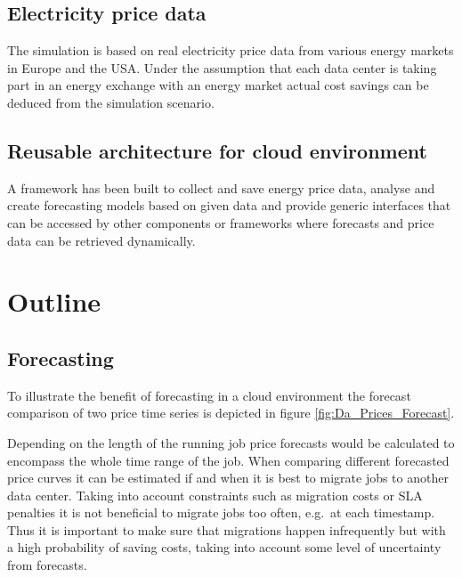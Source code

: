 \documentclass[paper=a4, fontsize=11pt]{scrartcl} %
\numberwithin{equation}{section} %
\numberwithin{figure}{section} %
\numberwithin{table}{section} %
\begin{document}

\subsection{Electricity price data}

The simulation is based on real electricity price data from various energy markets in Europe and the USA. Under the assumption that each data center is taking part in an energy exchange with an energy market actual cost savings can be deduced from the simulation scenario. 


\subsection{Reusable architecture for cloud environment}

A framework has been built to collect and save energy price data, analyse and create forecasting models based on given data and provide generic interfaces that can be accessed by other components or frameworks where forecasts and price data can be retrieved dynamically. 




\section{Outline}


\subsection{Forecasting}

To illustrate the benefit of forecasting in a cloud environment the forecast comparison of two price time series is depicted in figure \ref{fig:Da_Prices_Forecast}. 

Depending on the length of the running job price forecasts would be calculated to encompass the whole time range of the job. When comparing different forecasted price curves it can be estimated if and when it is best to migrate jobs to another data center. Taking into account constraints such as migration costs or SLA penalties it is not beneficial to migrate jobs too often, e.g.~at each timestamp. Thus it is important to make sure that migrations happen infrequently but with a high probability of saving costs, taking into account some level of uncertainty from forecasts. 
\end{document}
